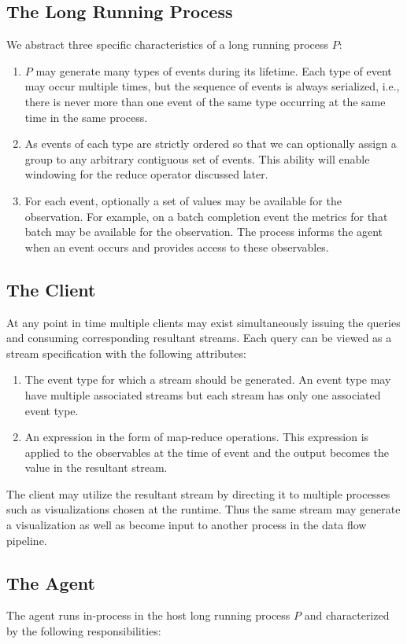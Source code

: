 \documentclass[sigchi]{acmart} %
\begin{document}
\subsection{The Long Running Process}
We abstract three specific characteristics of a long running process $P$:
\begin{enumerate}
  \item $P$ may generate many types of events during its lifetime. Each type of event may occur multiple times, but the sequence of events is always serialized, i.e., there is never more than one event of the same type occurring at the same time in the same process.
  \item As events of each type are strictly ordered so that we can optionally assign a group to any arbitrary contiguous set of events. This ability will enable windowing for the reduce operator discussed later.
  \item For each event, optionally a set of values may be available for the observation. For example, on a batch completion event the metrics for that batch may be available for the observation. The process informs the agent when an event occurs and provides access to these observables.
\end{enumerate}
\subsection{The Client}
At any point in time multiple clients may exist simultaneously issuing the queries and consuming corresponding resultant streams. Each query can be viewed as a stream specification with the following attributes:
\begin{enumerate}
  \item The event type for which a stream should be generated. An event type may have multiple associated streams but each stream has only one associated event type.
  \item An expression in the form of map-reduce operations. This expression is applied to the observables at the time of event and the output becomes the value in the resultant stream.
\end{enumerate}

The client may utilize the resultant stream by directing it to multiple processes such as visualizations chosen at the runtime. Thus the same stream may generate a visualization as well as become input to another process in the data flow pipeline.

\subsection{The Agent}
The agent runs in-process in the host long running process $P$ and characterized by the following responsibilities:
\end{document}
